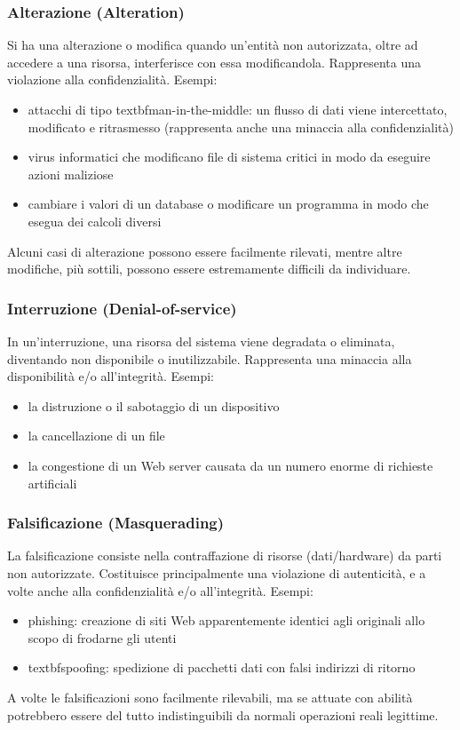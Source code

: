 \subsubsection{Alterazione (Alteration)}
Si ha una alterazione o modifica quando un’entità non autorizzata, oltre ad accedere a una risorsa, interferisce con essa modificandola. Rappresenta una violazione alla confidenzialità. Esempi:
\begin{itemize} 
  \item attacchi di tipo textbf{man-in-the-middle}: un flusso di dati viene intercettato, modificato e ritrasmesso (rappresenta anche una minaccia alla confidenzialità)
  \item virus informatici che modificano file di sistema critici in modo da eseguire azioni maliziose
  \item cambiare i valori di un database o modificare un programma in modo che esegua dei calcoli diversi
\end{itemize}
Alcuni casi di alterazione possono essere facilmente rilevati, mentre altre modifiche, più sottili, possono essere estremamente difficili da individuare.

\subsubsection{Interruzione (Denial-of-service)}
In un’interruzione, una risorsa del sistema viene degradata o eliminata, diventando non disponibile o inutilizzabile. Rappresenta una minaccia alla disponibilità e/o all'integrità. Esempi:
\begin{itemize} 
  \item la distruzione o il sabotaggio di un dispositivo
  \item la cancellazione di un file
  \item la congestione di un Web server causata da un numero enorme di richieste artificiali
\end{itemize}

\subsubsection{Falsificazione (Masquerading)}
La falsificazione consiste nella contraffazione di risorse (dati/hardware) da parti non autorizzate. Costituisce principalmente una violazione di autenticità, e a volte anche alla confidenzialità e/o all’integrità. Esempi:
\begin{itemize} 
  \item {phishing}: creazione di siti Web apparentemente identici agli originali allo scopo di frodarne gli utenti
  \item textbf{spoofing}: spedizione di pacchetti dati con falsi indirizzi di ritorno
\end{itemize}
A volte le falsificazioni sono facilmente rilevabili, ma se attuate con abilità potrebbero essere del tutto indistinguibili da normali operazioni reali legittime.

